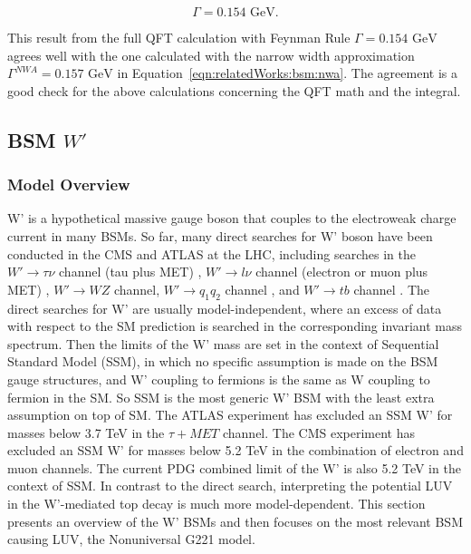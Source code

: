 \begin{equation}
         \Gamma = 0.154 \text{ GeV} .
\end{equation} 


\noindent This result from the full QFT calculation with Feynman Rule  $\Gamma = 0.154 \text{ GeV} $ agrees well with the one calculated with the narrow width approximation $\Gamma^{NWA} = 0.157 \text{ GeV} $ in Equation~\ref{eqn:relatedWorks:bsm:nwa}. The agreement is a good check for the above calculations concerning the QFT math and the integral.





 
\subsection{BSM $W'$}
\label{sec:relatedWorks:bsm:WPrime}

\subsubsection{Model Overview}

W' is a hypothetical massive gauge boson that couples to the electroweak charge current in many BSMs. So far, many direct searches for W' boson have been conducted in the CMS and ATLAS at the LHC, including searches in the $W'\to \tau \nu$  channel (tau plus MET) \cite{Sirunyan:2018lbg, Khachatryan:2015pua,Aaboud:2018vgh}, $W'\to l \nu$ channel (electron or muon plus MET) \cite{Sirunyan:2018mpc, Aaboud:2017efa}, $W'\to W Z$ channel\cite{Sirunyan:2018ivv, Aaboud:2017eta}, $W'\to q_1 q_2$ channel \cite{Sirunyan:2016iap, Aaboud:2017yvp}, and $W'\to t b$ channel \cite{Sirunyan:2017vkm, Aaboud:2018juj}. The direct searches for W' are usually model-independent, where an excess of data with respect to the SM prediction is searched in the corresponding invariant mass spectrum. Then the limits of the W' mass are set in the context of Sequential Standard Model (SSM), in which no specific assumption is made on the BSM gauge structures, and W' coupling to fermions is the same as W coupling to fermion in the SM. So SSM is the most generic W' BSM with the least extra assumption on top of SM. The ATLAS experiment has excluded an SSM W' for masses below 3.7 TeV in the $\tau+MET$ channel. The CMS experiment has excluded an SSM W' for masses below 5.2 TeV in the combination of electron and muon channels. The current PDG combined limit of the W' is also 5.2 TeV in the context of SSM. In contrast to the direct search, interpreting the potential LUV in the W'-mediated top decay is much more model-dependent. This section presents an overview of the W' BSMs and then focuses on the most relevant BSM causing LUV, the Nonuniversal G221 model.




